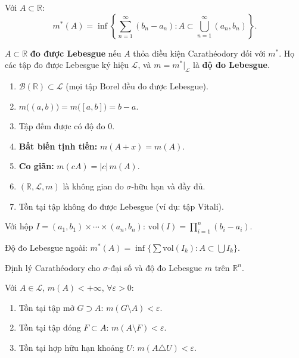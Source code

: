 \documentclass[12pt,a4paper]{article}
\begin{document}
\begin{dinhnghia}[title={Độ đo Lebesgue ngoài trên $\mathbb{R}$}]
  Với $A \subset \mathbb{R}$:
  \[
    m^*(A) = \inf\left\{\sum_{n=1}^{\infty} (b_n - a_n) : A \subset \bigcup_{n=1}^{\infty} (a_n, b_n)\right\}.
  \]
\end{dinhnghia}

\begin{dinhnghia}[title={Tập đo được Lebesgue}]
  $A \subset \mathbb{R}$ \textbf{đo được Lebesgue} nếu $A$ thỏa điều kiện Carathéodory đối với $m^*$. Họ các tập đo được Lebesgue ký hiệu $\mathcal{L}$, và $m = m^*|_{\mathcal{L}}$ là \textbf{độ đo Lebesgue}.
\end{dinhnghia}

\begin{tinhchat}[title={Tính chất độ đo Lebesgue}]
  \begin{enumerate}
    \item $\mathcal{B}(\mathbb{R}) \subset \mathcal{L}$ (mọi tập Borel đều đo được Lebesgue).
    \item $m\bigl((a, b)\bigr) = m\bigl([a, b]\bigr) = b - a$.
    \item Tập đếm được có độ đo $0$.
    \item \textbf{Bất biến tịnh tiến:} $m(A + x) = m(A)$.
    \item \textbf{Co giãn:} $m(cA) = |c|\,m(A)$.
    \item $(\mathbb{R}, \mathcal{L}, m)$ là không gian đo $\sigma$-hữu hạn và đầy đủ.
    \item Tồn tại tập không đo được Lebesgue (ví dụ: tập Vitali).
  \end{enumerate}
\end{tinhchat}

\begin{dinhnghia}[title={Độ đo Lebesgue trên $\mathbb{R}^n$}]
  Với hộp $I = (a_1, b_1) \times \cdots \times (a_n, b_n)$: $\text{vol}(I) = \prod_{i=1}^{n}(b_i - a_i)$.

  Độ đo Lebesgue ngoài: $m^*(A) = \inf\bigl\{\sum \text{vol}(I_k) : A \subset \bigcup I_k\bigr\}$.

  Định lý Carathéodory cho $\sigma$-đại số và độ đo Lebesgue $m$ trên $\mathbb{R}^n$.
\end{dinhnghia}

\begin{dinhly}[title={Xấp xỉ tập đo được}]
  Với $A \in \mathcal{L}$, $m(A) < +\infty$, $\forall \varepsilon > 0$:
  \begin{enumerate}
    \item Tồn tại tập mở $G \supset A$: $m(G \setminus A) < \varepsilon$.
    \item Tồn tại tập đóng $F \subset A$: $m(A \setminus F) < \varepsilon$.
    \item Tồn tại hợp hữu hạn khoảng $U$: $m(A \triangle U) < \varepsilon$.
  \end{enumerate}
\end{dinhly}
\end{document}
